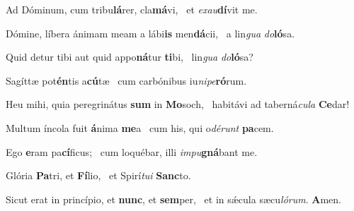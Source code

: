 \item Ad Dóminum, cum tribu\textbf{lá}rer, cla\textbf{má}vi,~\psstar{} et \textit{exau}\textbf{dí}vit me.

\item Dómine, líbera ánimam meam a lábi\textbf{is} men\textbf{dá}cii,~\psstar{} a lin\textit{gua} \textit{do}\textbf{ló}sa.

\item Quid detur tibi aut quid appo\textbf{ná}tur \textbf{ti}bi,~\psstar{} lin\textit{gua} \textit{do}\textbf{ló}sa?

\item Sagíttæ pot\textbf{én}tis a\textbf{cú}tæ~\psstar{} cum carbónibus iu\textit{nipe}\textbf{ró}rum.

\item Heu mihi, quia peregrinátus \textbf{sum} in \textbf{Mo}soch,~\psstar{} habitávi ad taberná\textit{cula} \textbf{Ce}dar!

\item Multum íncola fuit \textbf{á}nima \textbf{me}a~\psstar{} cum his, qui o\textit{dérunt} \textbf{pa}cem.

\item Ego \textbf{e}ram pa\textbf{cí}ficus;~\psstar{} cum loquébar, illi \textit{impu}\textbf{gná}bant me.

\item Glória \textbf{Pa}tri, et \textbf{Fí}lio,~\psstar{} et Spirí\textit{tui} \textbf{Sanc}to.

\item Sicut erat in princípio, et \textbf{nunc}, et \textbf{sem}per,~\psstar{} et in sǽcula sæcu\textit{lórum}. \textbf{A}men.